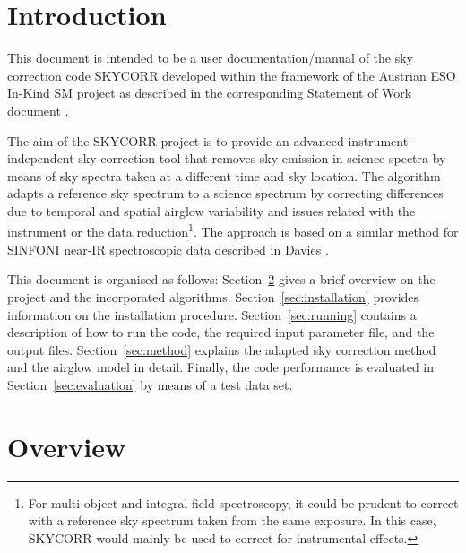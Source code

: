 \section{Introduction}\label{sec:introduction}
This document is intended to be a user documentation/manual of the sky
correction code SKYCORR developed within the framework of the Austrian
\acs{ESO} In-Kind SM project as described in the corresponding Statement of
Work document \cite{SM-SoW}.

The aim of the SKYCORR project is to provide an advanced instrument-independent
sky-correction tool that removes sky emission in science spectra by means of
sky spectra taken at a different time and sky location. The algorithm adapts a
reference sky spectrum to a science spectrum by correcting differences due to
temporal and spatial airglow variability and issues related with the instrument
or the data reduction\footnote{For multi-object and integral-field
spectroscopy, it could be prudent to correct with a reference sky spectrum
taken from the same exposure. In this case, SKYCORR would mainly be used to
correct for instrumental effects.}. The approach is based on a similar method
for SINFONI near-IR spectroscopic data described in Davies \cite{DAV07}.

This document is organised as follows: Section~\ref{sec:overview} gives a
brief overview on the project and the incorporated algorithms.
Section~\ref{sec:installation} provides information on the installation
procedure. Section~\ref{sec:running} contains a description of how to run the
code, the required input parameter file, and the output files.
Section~\ref{sec:method} explains the adapted sky correction method and the
airglow model in detail. Finally, the code performance is evaluated in
Section~\ref{sec:evaluation} by means of a test data set.

\section{Overview}\label{sec:overview}
